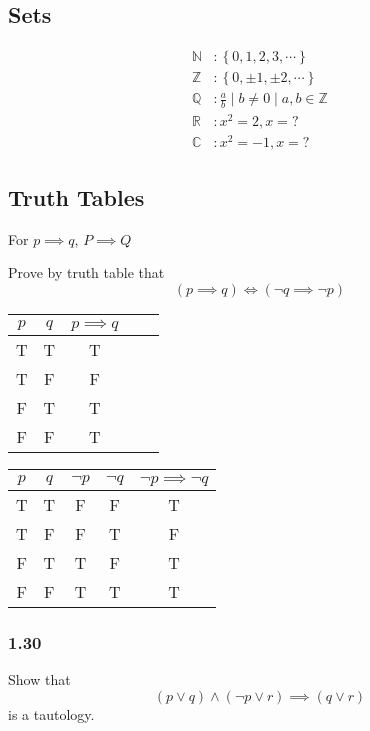 \documentclass{article}
\begin{document}
\subsection{Sets}

\begin{align*}
	\mathbb{N} & : \left\{ 0, 1, 2, 3, \cdots \right\} \\
	\mathbb{Z} & : \left\{ 0, \pm 1, \pm 2, \cdots \right\} \\
	\mathbb{Q} & : \frac{ a }{ b } \mid b \neq 0 \mid a, b \in \mathbb{Z} \\
	\mathbb{R} & : x^{2} = 2, x = ? \\
	\mathbb{C} & : x^{2} = -1, x = ?
\end{align*}

\subsection{Truth Tables}

For $ p \implies q $, $ P \implies Q $

Prove by truth table that
$$ ( p \implies q ) \iff ( \neg q \implies \neg p ) $$
\begin{tabular}{ | c | c | c | c | c | }
	$ p $ & $ q $ & $ p \implies q $ \\
	\hline
	T & T & T \\
	T & F & F \\
	F & T & T \\
	F & F & T
\end{tabular}

\begin{tabular}{ | c | c | c | c | c | }
	$ p $ & $ q $ & $ \neg p $ & $ \neg q $ & $ \neg p \implies \neg q $ \\
	\hline
	T & T & F & F & T \\
	T & F & F & T & F \\
	F & T & T & F & T \\
	F & F & T & T & T
\end{tabular}

\subsubsection{1.30}

Show that $$ ( p \lor q ) \land ( \neg p \lor r ) \implies ( q \lor r ) $$ is a tautology.
\end{document}
